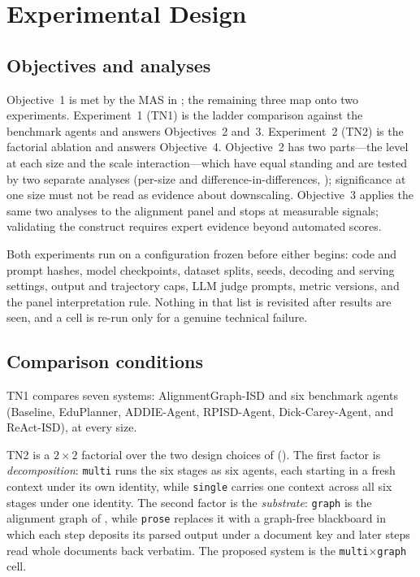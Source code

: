 \section{Experimental Design}
\label{sec:experimental-methodology}

\subsection{Objectives and analyses}
\label{sec:rqs}

Objective~1 is met by the MAS in ; the remaining three map onto
two experiments. Experiment~1 (TN1) is the ladder comparison against the benchmark
agents and answers Objectives~2 and~3. Experiment~2 (TN2) is the factorial ablation
and answers Objective~4. Objective~2 has two parts---the level at each size and the
scale interaction---which have equal standing and are tested by two separate
analyses (per-size and difference-in-differences, ); significance at
one size must not be read as evidence about downscaling. Objective~3 applies the
same two analyses to the alignment panel and stops at measurable signals; validating
the construct requires expert evidence beyond automated scores.

Both experiments run on a configuration frozen before either begins: code and
prompt hashes, model checkpoints, dataset splits, seeds, decoding and serving
settings, output and trajectory caps, LLM judge prompts, metric versions, and the panel
interpretation rule. Nothing in that list is revisited after results are seen, and a
cell is re-run only for a genuine technical failure.

\subsection{Comparison conditions}
\label{sec:conditions}

TN1 compares seven systems: AlignmentGraph-ISD and six benchmark agents (Baseline,
EduPlanner, ADDIE-Agent, RPISD-Agent, Dick-Carey-Agent, and ReAct-ISD), at every
size.

TN2 is a $2\times2$ factorial over the two design choices of 
(). The first factor is \emph{decomposition}: \texttt{multi}
runs the six stages as six agents, each starting in a fresh context under its own
identity, while \texttt{single} carries one context across all six stages under one
identity. The second factor is the \emph{substrate}: \texttt{graph} is the alignment
graph of , while \texttt{prose} replaces it with a
graph-free blackboard in which each step deposits its parsed output under a document
key and later steps read whole documents back verbatim. The proposed system is the
\texttt{multi}$\times$\texttt{graph} cell.

